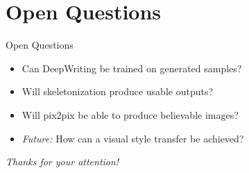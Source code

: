 \documentclass[aspectratio=169]{beamer}
\begin{document}
\section{Open Questions}
\begin{frame}{Open Questions}
\begin{itemize}
\item Can DeepWriting be trained on generated samples?
\item Will skeletonization produce usable outputs?
\item Will pix2pix be able to produce believable images?
\item \emph{Future:} How can a visual style transfer be achieved?
\end{itemize}
\vspace{2em}
\begin{center}
\begin{Large}
\emph{Thanks for your attention!}
\end{Large}
\end{center}
\end{frame}
\end{document}
